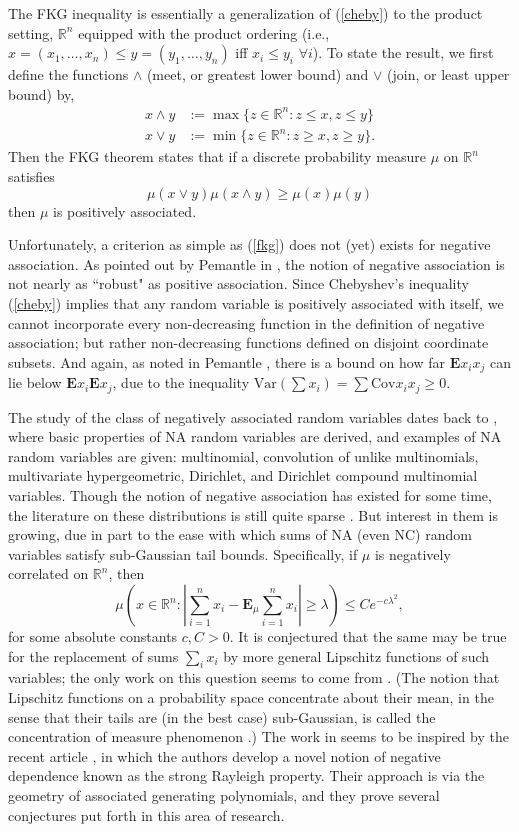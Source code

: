 \documentclass[11pt]{article}
\newcommand{\E}{\mathbf{E}}
\newcommand{\R}{\mathbb{R}}
\newcommand{\C}{\text{Cov}}
\begin{document}
The FKG inequality is essentially a generalization of (\ref{cheby}) to the product setting, $\R^n$ equipped with the product ordering (i.e., $x=(x_1,\dots, x_n) \leq y=(y_1,\dots, y_n)$ iff $x_i\leq y_i$ $\forall i$). To state the result, we first define the functions $\wedge$ (meet, or greatest lower bound) and $\vee$ (join, or least upper bound) by,
\begin{align*}
x\wedge y &:= \max\{ z\in \R^n: z\leq x, z\leq y\}\\
x\vee y &:= \min\{ z\in \R^n : z\geq x, z\geq y\}.
\end{align*}
Then the FKG theorem states that if a discrete probability measure $\mu$ on $\R^n$ satisfies
\begin{equation}\label{fkg}
\mu(x\vee y)\mu(x\wedge y)\geq \mu(x)\mu(y)
\end{equation}
then $\mu$ is positively associated. 

Unfortunately, a criterion as simple as (\ref{fkg}) does not (yet) exists for negative association. As pointed out by Pemantle in \cite{pemantle}, the notion of negative association is not nearly as ``robust" as positive association. Since Chebyshev's inequality (\ref{cheby}) implies that any random variable is positively associated with itself, we cannot incorporate every non-decreasing function in the definition of negative association; but rather non-decreasing functions defined on disjoint coordinate subsets. And again, as noted in Pemantle \cite{pemantle}, there is a bound on how far $\E x_ix_j$ can lie below $\E x_i \E x_j$, due to the inequality $\text{Var}\left(\sum x_i\right) =\sum \C x_ix_j\geq 0$. 


The study of the class of negatively associated random variables dates back to \cite{NA}, where basic properties of NA random variables are derived, and examples of NA random variables are given: multinomial, convolution of unlike multinomials, multivariate hypergeometric, Dirichlet, and Dirichlet compound multinomial variables. Though the notion of negative association has existed for some time, 
the literature on these distributions is still quite sparse \cite{NA,balls,pemantle,ndgeometry}. 
But interest in them is growing, due in part to the ease with which 
sums of NA (even NC) random variables satisfy sub-Gaussian tail bounds. Specifically, if $\mu$ is negatively correlated on $\R^n$, then 
\[
\mu\left( x\in \R^n: \left|\sum_{i=1}^nx_i - \E_{\mu}\sum_{i=1}^nx_i\right| \geq \lambda\right) \leq 
Ce^{-c\lambda^2},
\]
for some absolute constants $c,C>0$.
It is conjectured that the same may be true for the replacement of sums $\sum_i x_i$ by more general Lipschitz functions
of such variables; the only work on this question seems to come from \cite{peres}. (The notion that Lipschitz functions on a probability space concentrate about their mean, in the sense that their tails are (in the best case) sub-Gaussian, is called the concentration of measure phenomenon \cite{CM}.) The work in \cite{peres} seems to be inspired by the recent article \cite{ndgeometry}, in which the authors develop a novel notion of negative dependence known as the strong Rayleigh property. Their approach is via the geometry of associated generating polynomials, and they prove several conjectures put forth in this area of research.  
\end{document}
